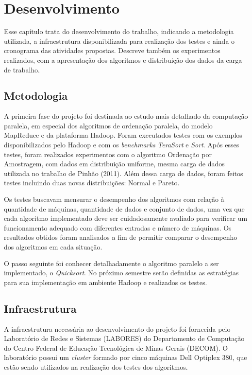 \chapter{Desenvolvimento}
\label{cap:desenvolvimento}

Esse capítulo trata do desenvolvimento do trabalho, indicando a metodologia utilizada, a infraestrutura disponibilizada para realização dos testes e ainda o cronograma das atividades propostas. Descreve também os experimentos realizados, com a apresentação dos algoritmos e distribuição dos dados da carga de trabalho.

\section{Metodologia}

A primeira fase do projeto foi destinada ao estudo mais detalhado da computação paralela, em especial dos algoritmos de ordenação paralela, do modelo MapReduce e da plataforma Hadoop. Foram executados testes com os exemplos disponibilizados pelo Hadoop e com os \textit{benchmarks} \textit{TeraSort} e \textit{Sort}. 
Após esses testes, foram realizados experimentos com o algoritmo Ordenação por Amostragem, com dados em distribuição uniforme, mesma carga de dados utilizada no trabalho de Pinhão (2011). Além dessa carga de dados, foram feitos testes incluindo duas novas distribuições: Normal e Pareto. 

Os testes buscavam mensurar o desempenho dos algoritmos com relação à quantidade de máquinas, quantidade de dados e conjunto de dados, uma vez que cada algoritmo implementado deve ser cuidadosamente avaliado para verificar um funcionamento adequado com diferentes entradas e número de máquinas. Os resultados obtidos foram analisados a fim de permitir comparar o desempenho dos algoritmos em cada situação.
 
O passo seguinte foi conhecer detalhadamente o algoritmo paralelo a ser implementado, o \textit{Quicksort}.  No próximo semestre serão definidas as estratégias para sua implementação em ambiente Hadoop e realizados os testes.

\section{Infraestrutura}

A infraestrutura necessária ao desenvolvimento do projeto foi fornecida pelo Laboratório de Redes e Sistemas (LABORES) do Departamento de Computação do Centro Federal de Educação Tecnológica de Minas Gerais (DECOM). O laboratório possui um \textit{cluster} formado por cinco máquinas Dell Optiplex 380, que estão sendo utilizados na realização dos testes dos algoritmos. 

